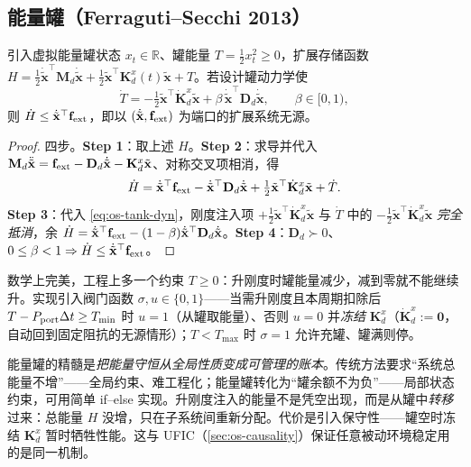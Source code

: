 \subsection{能量罐（Ferraguti--Secchi 2013）}
\label{sec:os-energytank}

\begin{theorem}[能量罐保无源]
\label{thm:os-energytank}
引入虚拟能量罐状态 $x_t\in\mathbb R$、罐能量 $T=\tfrac12 x_t^2\ge0$，扩展存储函数 $H=\tfrac12\dot{\tilde{\mathbf x}}^\top\mathbf M_d\dot{\tilde{\mathbf x}}+\tfrac12\tilde{\mathbf x}^\top\mathbf K_d^x(t)\tilde{\mathbf x}+T$。若设计罐动力学使
\begin{equation}
  \dot T=-\tfrac12\tilde{\mathbf x}^\top\dot{\mathbf K}_d^x\tilde{\mathbf x}+\beta\,\dot{\tilde{\mathbf x}}^\top\mathbf D_d\dot{\tilde{\mathbf x}},\qquad\beta\in[0,1),
  \label{eq:os-tank-dyn}
\end{equation}
则 $\dot H\le\dot{\tilde{\mathbf x}}^\top\mathbf f_{\rm ext}$，即以 $(\dot{\tilde{\mathbf x}},\mathbf f_{\rm ext})$ 为端口的扩展系统无源。
\end{theorem}
\begin{proof}
四步。\textbf{Step 1}：取上述 $H$。\textbf{Step 2}：求导并代入 $\mathbf M_d\ddot{\tilde{\mathbf x}}=\mathbf f_{\rm ext}-\mathbf D_d\dot{\tilde{\mathbf x}}-\mathbf K_d^x\tilde{\mathbf x}$、对称交叉项相消，得
\[
  \dot H=\dot{\tilde{\mathbf x}}^\top\mathbf f_{\rm ext}-\dot{\tilde{\mathbf x}}^\top\mathbf D_d\dot{\tilde{\mathbf x}}+\tfrac12\tilde{\mathbf x}^\top\dot{\mathbf K}_d^x\tilde{\mathbf x}+\dot T.
\]
\textbf{Step 3}：代入 \cref{eq:os-tank-dyn}，刚度注入项 $+\tfrac12\tilde{\mathbf x}^\top\dot{\mathbf K}_d^x\tilde{\mathbf x}$ 与 $\dot T$ 中的 $-\tfrac12\tilde{\mathbf x}^\top\dot{\mathbf K}_d^x\tilde{\mathbf x}$ \emph{完全抵消}，余 $\dot H=\dot{\tilde{\mathbf x}}^\top\mathbf f_{\rm ext}-(1-\beta)\dot{\tilde{\mathbf x}}^\top\mathbf D_d\dot{\tilde{\mathbf x}}$。\textbf{Step 4}：$\mathbf D_d\succ0$、$0\le\beta<1\Rightarrow\dot H\le\dot{\tilde{\mathbf x}}^\top\mathbf f_{\rm ext}$。
\end{proof}

数学上完美，工程上多一个约束 $T\ge0$：升刚度时罐能量减少，减到零就不能继续升。实现引入阀门函数 $\sigma,u\in\{0,1\}$——当需升刚度且本周期扣除后 $T-P_{\rm port}\Delta t\ge T_{\min}$ 时 $u=1$（从罐取能量）、否则 $u=0$ 并\emph{冻结} $\mathbf K_d^x$（$\dot{\mathbf K}_d^x:=\mathbf 0$，自动回到固定阻抗的无源情形）；$T<T_{\max}$ 时 $\sigma=1$ 允许充罐、罐满则停。

\begin{insight}
能量罐的精髓是\emph{把能量守恒从全局性质变成可管理的账本}。传统方法要求“系统总能量不增”——全局约束、难工程化；能量罐转化为“罐余额不为负”——局部状态约束，可用简单 if--else 实现。升刚度注入的能量不是凭空出现，而是从罐中\emph{转移}过来：总能量 $H$ 没增，只在子系统间重新分配。代价是引入保守性——罐空时冻结 $\mathbf K_d^x$ 暂时牺牲性能。这与 UFIC（\cref{sec:os-causality}）保证任意被动环境稳定用的是同一机制。
\end{insight}

